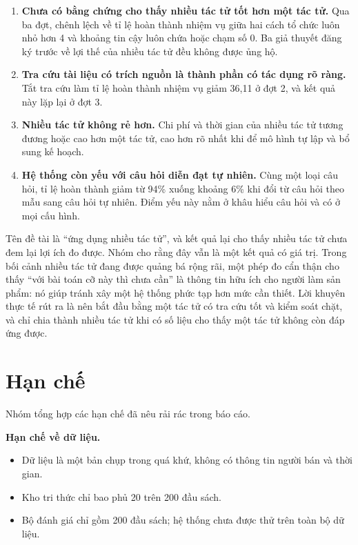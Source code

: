 \begin{enumerate}
    \item \textbf{Chưa có bằng chứng cho thấy nhiều tác tử tốt hơn một tác tử.} Qua ba đợt, chênh lệch về tỉ lệ hoàn thành nhiệm vụ giữa hai cách tổ chức luôn nhỏ hơn 4 \pp{} và khoảng tin cậy luôn chứa hoặc chạm số 0. Ba giả thuyết đăng ký trước về lợi thế của nhiều tác tử đều không được ủng hộ.

    \item \textbf{Tra cứu tài liệu có trích nguồn là thành phần có tác dụng rõ ràng.} Tắt tra cứu làm tỉ lệ hoàn thành nhiệm vụ giảm 36,11 \pp{} ở đợt 2, và kết quả này lặp lại ở đợt 3.

    \item \textbf{Nhiều tác tử không rẻ hơn.} Chi phí và thời gian của nhiều tác tử tương đương hoặc cao hơn một tác tử, cao hơn rõ nhất khi để mô hình tự lập và bổ sung kế hoạch.

    \item \textbf{Hệ thống còn yếu với câu hỏi diễn đạt tự nhiên.} Cùng một loại câu hỏi, tỉ lệ hoàn thành giảm từ 94\% xuống khoảng 6\% khi đổi từ câu hỏi theo mẫu sang câu hỏi tự nhiên. Điểm yếu này nằm ở khâu hiểu câu hỏi và có ở mọi cấu hình.
\end{enumerate}

Tên đề tài là ``ứng dụng nhiều tác tử'', và kết quả lại cho thấy nhiều tác tử chưa đem lại lợi ích đo được. Nhóm cho rằng đây vẫn là một kết quả có giá trị. Trong bối cảnh nhiều tác tử đang được quảng bá rộng rãi, một phép đo cẩn thận cho thấy ``với bài toán cỡ này thì chưa cần'' là thông tin hữu ích cho người làm sản phẩm: nó giúp tránh xây một hệ thống phức tạp hơn mức cần thiết. Lời khuyên thực tế rút ra là nên bắt đầu bằng một tác tử có tra cứu tốt và kiểm soát chặt, và chỉ chia thành nhiều tác tử khi có số liệu cho thấy một tác tử không còn đáp ứng được.

\section{Hạn chế}

Nhóm tổng hợp các hạn chế đã nêu rải rác trong báo cáo.

\textbf{Hạn chế về dữ liệu.}
\begin{itemize}
    \item Dữ liệu là một bản chụp trong quá khứ, không có thông tin người bán và thời gian.
    \item Kho tri thức chỉ bao phủ 20 trên 200 đầu sách.
    \item Bộ đánh giá chỉ gồm 200 đầu sách; hệ thống chưa được thử trên toàn bộ dữ liệu.
\end{itemize}

